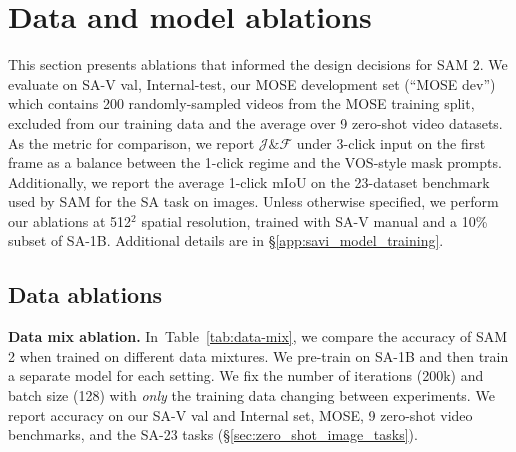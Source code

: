 \documentclass[]{fairmeta}
\renewcommand{\paragraph}[1]{\vspace{1.25mm}\noindent\textbf{#1}}
\newcommand{\secref}[1]{\S\ref{#1}}
\newcommand{\tabref}[1]{Table~\ref{#1}}
\newcommand{\jf}{$\mathcal{J}\&\mathcal{F}$\xspace}
\renewcommand{\paragraph}[1]{\vspace{1.25mm}\noindent\textbf{#1}}
\begin{document}
\section{Data and model ablations}
\label{app:sec:ablations}

This section presents ablations that informed the design decisions for SAM 2. We evaluate on SA-V val, Internal-test, our MOSE development set (``MOSE dev'') which contains 200 randomly-sampled videos from the MOSE training split, excluded from our training data and the average over 9 zero-shot video datasets. As the metric for comparison, we report \jf under 3-click input on the first frame as a balance between the 1-click regime and the VOS-style mask prompts. Additionally, we report the average 1-click mIoU on the 23-dataset benchmark used by SAM for the SA task on images. Unless otherwise specified, we perform our ablations at 512$^2$ spatial resolution, trained with SA-V manual and a 10\% subset of SA-1B. Additional details are in \secref{app:savi_model_training}.

\subsection{Data ablations}
\label{sec:ablations_subsection}

\begin{table}[!h]
    \vspace{5pt}
    
    \caption{We train our model on different data mixtures including VOS (DAVIS, MOSE, YouTubeVOS), and subsets of Internal-train, SA-V, and SA-1B. 
    We report the \jf accuracy when prompted with 3 clicks in the first frame on SA-V val and Internal-test, MOSE, and 9 zero-shot datasets, and the average 1-click mIoU on SA-23 datasets. %
    }
    \vspace{10pt}
    \label{tab:data-mix}
\end{table}

\paragraph{Data mix ablation.} In~\tabref{tab:data-mix}, we compare the accuracy of SAM 2 when trained on different data mixtures. We pre-train on SA-1B and then train a separate model for each setting. We fix the number of iterations (200k) and batch size (128) with \textit{only} the training data changing between experiments. We report accuracy on our SA-V val and Internal set, MOSE, 9 zero-shot video benchmarks, and the SA-23 tasks (\S\ref{sec:zero_shot_image_tasks}). 
\end{document}
